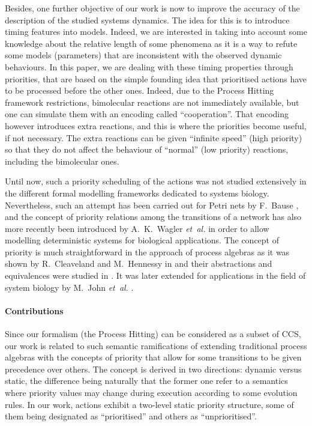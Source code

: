 Besides, one further objective of our work is now %
to improve the accuracy of the description of the studied systems dynamics.
The idea for this is to introduce timing features into models.
Indeed, we are interested in taking into account some knowledge about the relative length of some phenomena as it is a way to refute some models (parameters) that are inconsistent with the observed dynamic behaviours.
In this paper, we are dealing with these timing properties through priorities,
that are based on the simple founding idea that prioritised actions have to be processed before the other ones.
Indeed, due to the Process Hitting framework restrictions, bimolecular reactions are not immediately available, but one can simulate them with an encoding called “cooperation”.
That encoding however introduces extra reactions, and this is where the priorities become useful, if not necessary.
The extra reactions can be given “infinite speed” (high priority) so that they do not affect the behaviour of “normal” (low priority) reactions, including the bimolecular ones.

Until now, such a priority scheduling of the actions was not studied extensively in the different formal modelling frameworks dedicated to systems biology.
Nevertheless, such an attempt has been carried out for Petri nets by F.~Bause \cite{Bause97},
and the concept of priority relations among the transitions of a network has also more recently been introduced by A.~K.~Wagler \textit{et~al.} \cite{waw,WaglerW12} in order to allow modelling deterministic systems for biological applications.
The concept of priority is much straightforward in the approach of process algebras as it was shown by R.~Cleaveland and M.~Hennessy in \cite{Cleaveland199058,Cleaveland99prioritiesin} and their abstractions and equivalences were studied in \cite{Cleaveland:2007:PAP:1282576.1282847}.
It was later extended for applications in the field of system biology by M.~John \textit{et~al.} \cite{jlnu2010}.

\paragraph{Contributions}
Since our formalism (the Process Hitting) can be considered as a subset of CCS, %
our work is related to such semantic ramifications of extending traditional process algebras with the concepts of priority that allow for some transitions to be given precedence over others.
The concept is derived in two directions: dynamic versus static, the difference being naturally that the former one refer to a semantics where priority values may change during execution according to some evolution rules.
In our work, actions exhibit a two-level static priority structure, some of them being designated as “prioritised” and others as “unprioritised”.

